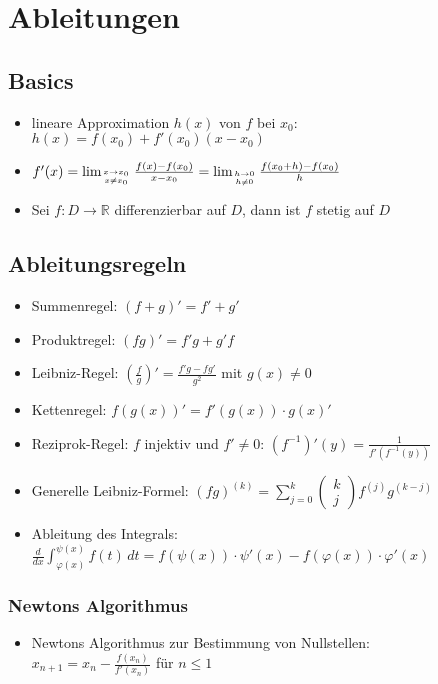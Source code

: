 \documentclass[a3paper, 11pt, landscape]{scrartcl}
\begin{document}
\begin{multicols*}{3}
\begin{enumerate}
\begin{itemize}
	\end{itemize}
	    
	\end{enumerate}
	    
	\section{Ableitungen}
	\subsection{Basics}
	\begin{itemize}
	    \item lineare Approximation $h(x)$ von $f$ bei $x_0$: $h(x)=f(x_0)+f'(x_0)(x-x_0)$ 
	    \item $f'(x)=\lim _{x \rightarrow x_{0} \atop x \neq x_{0}} \frac{f(x)-f\left(x_{0}\right)}{x-x_{0}} = \lim _{h \rightarrow 0 \atop h \neq 0} \frac{f\left(x_{0}+h\right)-f\left(x_{0}\right)}{h}$
	    \item Sei $f:D\to \mathbb{R}$ differenzierbar auf $D$, dann ist $f$ stetig auf $D$
	\end{itemize}
	
	\subsection{Ableitungsregeln}
    \begin{itemize}
        \item Summenregel: $(f+g)'=f'+g'$
        \item Produktregel: $(fg)'=f'g + g'f$
        \item Leibniz-Regel: $(\frac{f}{g})' = \frac{f'g-fg'}{g^2}$ mit $g(x)\neq 0$
        \item Kettenregel: $f(g(x))'=f'(g(x))\cdot g(x)'$
        \item Reziprok-Regel: $f$ injektiv und $f'\neq 0 $: $(f^{-1})'(y)=\frac{1}{f'(f^{-1}(y))}$
        \item Generelle Leibniz-Formel: $(f g)^{(k)}=\sum_{j=0}^{k}\left(\begin{array}{l}k \\ j \end{array}\right) f^{(j)} g^{(k-j)}$
        \item Ableitung des Integrals: $\frac{d}{dx}\int_ {\varphi(x)}^{\psi (x)}f(t)\,dt = f(\psi(x))\cdot \psi'(x)-f(\varphi(x))\cdot\varphi'(x)$
    \end{itemize}
    \subsubsection{Newtons Algorithmus}
    \begin{itemize}
        \item Newtons Algorithmus zur Bestimmung von Nullstellen:\\
        $x_{n+1}=x_n-\frac{f(x_n)}{f'(x_n)}$ für $n\leq 1$
    \end{itemize}


\end{multicols*}
\end{document}
